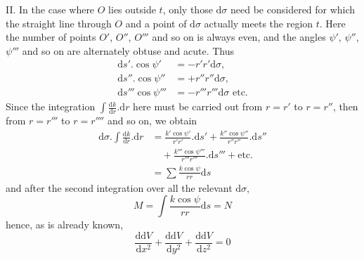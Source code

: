 II. In the case where $O$ lies outside $t$, only those $\mathrm{d}\sigma$ need be considered for which the straight line through $O$ and a point of $\mathrm{d}\sigma$ actually meets the region $t$. Here the number of points $O'$, $O''$, $O'''$ and so on is always even, and the angles $\psi'$, $\psi''$, $\psi'''$ and so on are alternately obtuse and acute. Thus
\[
\begin{aligned}
\mathrm{d}s'.\cos\psi'&=-r'r'\mathrm{d}\sigma,\\
\mathrm{d}s''.\cos\psi''&=+r''r''\mathrm{d}\sigma,\\
\mathrm{d}s'''\cos\psi'''&=-r'''r'''\mathrm{d}\sigma\text{ etc.}
\end{aligned}
\]
Since the integration $\int\frac{\mathrm{d}k}{\mathrm{d}r}.\mathrm{d}r$ here must be carried out from $r=r'$ to $r=r''$, then from $r=r'''$
%
to $r=r''''$ and so on, we obtain
\[
\begin{aligned}
\mathrm{d}\sigma.\int\frac{\mathrm{d}k}{\mathrm{d}r}.\mathrm{d}r&=\frac{k'\cos\psi'}{r'r'}.\mathrm{d}s'+\frac{k''\cos\psi''}{r''r''}.\mathrm{d}s''\\
&\quad{}+\frac{k'''\cos\psi'''}{r'''r'''}.\mathrm{d}s'''+\text{etc.}\\
&=\sum\frac{k\cos\psi}{rr}\mathrm{d}s
\end{aligned}
\]
and after the second integration over all the relevant $\mathrm{d}\sigma$,
\[
M=\int\frac{k\cos\psi}{rr}\mathrm{d}s=N
\]
hence, as is already known,
\[
\frac{\mathrm{d}\mathrm{d}V}{\mathrm{d}x^2}+\frac{\mathrm{d}\mathrm{d}V}{\mathrm{d}y^2}+\frac{\mathrm{d}\mathrm{d}V}{\mathrm{d}z^2}=0
\]

